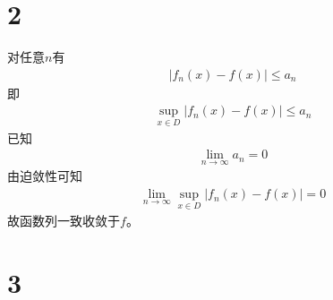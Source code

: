 \documentclass{article}
\begin{document}
\section*{2}

对任意$n$有
\begin{align*}
  |f_n(x) - f(x)| \leq a_n
\end{align*}
即
\begin{align*}
  \sup\limits_{x \in D} |f_n(x) - f(x)| \leq a_n
\end{align*}
已知
\begin{align*}
  \lim\limits_{n \to \infty} a_n = 0
\end{align*}
由迫敛性可知
\begin{align*}
  \lim\limits_{n \to \infty} \sup\limits_{x \in D} |f_n(x) - f(x)| = 0
\end{align*}
故函数列一致收敛于$f$。

\section*{3}
\end{document}
